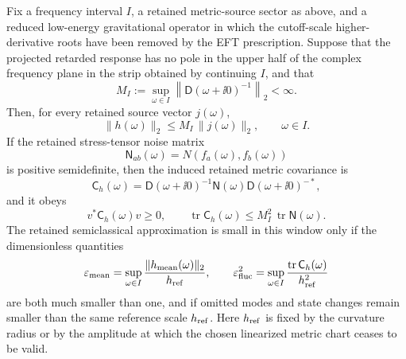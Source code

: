 \begin{controlledapproximation}
\label{ca:semiclassical-finite-response-window}
Fix a frequency interval \(I\), a retained metric-source sector as above, and
a reduced low-energy gravitational operator in which the cutoff-scale
higher-derivative roots have been removed by the EFT prescription.  Suppose
that the projected retarded response has no pole in the upper half of the
complex frequency plane in the strip obtained by continuing \(I\), and that
\begin{equation}
  M_I
  :=
  \sup_{\omega\in I}
  \left\lVert \mathsf D(\omega+\ii0)^{-1}\right\rVert_2
  <\infty .
  \label{eq:semiclassical-response-window-bound}
\end{equation}
Then, for every retained source vector \(j(\omega)\),
\begin{equation}
  \lVert h(\omega)\rVert_2
  \le
  M_I\,\lVert j(\omega)\rVert_2,
  \qquad
  \omega\in I.
  \label{eq:semiclassical-mean-response-bound}
\end{equation}
If the retained stress-tensor noise matrix
\[
  \mathsf N_{ab}(\omega)
  =
  N(f_a(\omega),f_b(\omega))
\]
is positive semidefinite, then the induced retained metric covariance is
\begin{equation}
  \mathsf C_h(\omega)
  =
  \mathsf D(\omega+\ii0)^{-1}
  \mathsf N(\omega)
  \mathsf D(\omega+\ii0)^{-*},
  \label{eq:semiclassical-retained-metric-covariance}
\end{equation}
and it obeys
\begin{equation}
  v^*\mathsf C_h(\omega)v\ge0,
  \qquad
  \operatorname{tr}\mathsf C_h(\omega)
  \le
  M_I^2\,\operatorname{tr}\mathsf N(\omega).
  \label{eq:semiclassical-retained-noise-bound}
\end{equation}
The retained semiclassical approximation is small in this window only if the
dimensionless quantities
\begin{equation}
  \varepsilon_{\rm mean}
  =
  \sup_{\omega\in I}
  \frac{\lVert h_{\rm mean}(\omega)\rVert_2}{h_{\rm ref}},
  \qquad
  \varepsilon_{\rm fluc}^2
  =
  \sup_{\omega\in I}
  \frac{\operatorname{tr}\mathsf C_h(\omega)}{h_{\rm ref}^2}
  \label{eq:semiclassical-response-small-parameters}
\end{equation}
are both much smaller than one, and if omitted modes and state changes remain
smaller than the same reference scale \(h_{\rm ref}\).  Here \(h_{\rm ref}\)
is fixed by the curvature radius or by the amplitude at which the chosen
linearized metric chart ceases to be valid.
\end{controlledapproximation}

